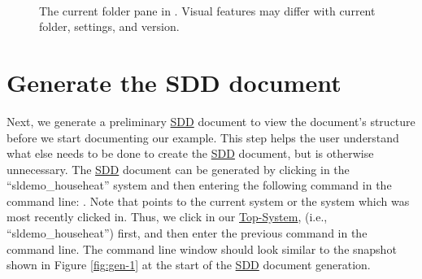 \documentclass{mcscert}
\newcommand{\topsystemnolink}{Top-System} %
\newcommand{\topsystem}{\hyperref[def:topsystem]{\topsystemnolink{}}}
\begin{document}
\begin{figure}
	\caption{The current folder pane in \matlab{}. 
	Visual features may differ with current folder, settings, and \matlab{} version.}
	\centering
	\label{fig:current-folder-1}
	\\
\end{figure}

\section*{Generate the SDD document}
Next, we generate a preliminary \hyperref[acr:sdd]{SDD} document to view the document's structure before we start documenting our example. 
This step helps the user understand what else needs to be done to create the \hyperref[acr:sdd]{SDD} document, but is otherwise unnecessary. 
The \hyperref[acr:sdd]{SDD} document can be generated by clicking in the ``sldemo\_househeat'' \simulink{} system and then entering the following command in the \matlab{} command line: . 
Note that  points to the current \simulink{} system or the system which was most recently clicked in. 
Thus, we click in our \topsystem{},
(i.e., ``sldemo\_househeat'') first, and then enter the previous command in the \matlab{} command line. 
The \matlab{} command line window should look similar to the snapshot shown in Figure \ref{fig:gen-1} at the start of the \hyperref[acr:sdd]{SDD} document generation.
\end{document}
